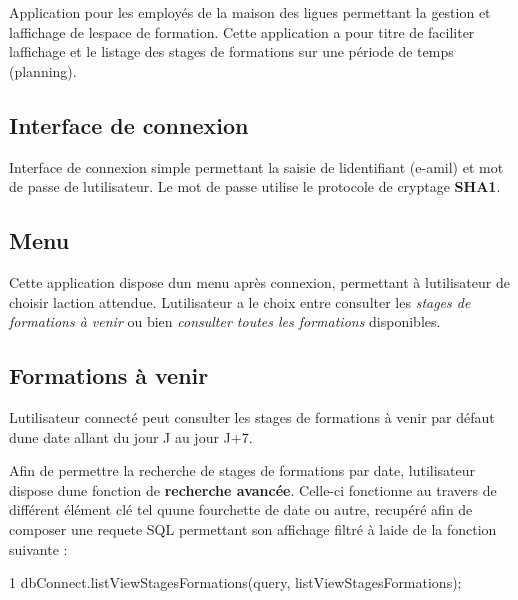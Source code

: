 Application pour les employés de la maison des ligues permettant la gestion et l\textquotesingle{}affichage de l\textquotesingle{}espace de formation. Cette application a pour titre de faciliter l\textquotesingle{}affichage et le listage des stages de formations sur une période de temps (planning).

\subsection*{Interface de connexion}

Interface de connexion simple permettant la saisie de l\textquotesingle{}identifiant (e-\/amil) et mot de passe de l\textquotesingle{}utilisateur. Le mot de passe utilise le protocole de cryptage {\bfseries S\+H\+A1}.



\subsection*{Menu}

Cette application dispose d\textquotesingle{}un menu après connexion, permettant à l\textquotesingle{}utilisateur de choisir l\textquotesingle{}action attendue. L\textquotesingle{}utilisateur a le choix entre consulter les {\itshape stages de formations à venir} ou bien {\itshape consulter toutes les formations} disponibles.

\subsection*{Formations à venir}

L\textquotesingle{}utilisateur connecté peut consulter les stages de formations à venir par défaut d\textquotesingle{}une date allant du jour J au jour J+7.



Afin de permettre la recherche de stages de formations par date, l\textquotesingle{}utilisateur dispose d\textquotesingle{}une fonction de {\bfseries recherche avancée}. Celle-\/ci fonctionne au travers de différent élément clé tel qu\textquotesingle{}une fourchette de date ou autre, recupéré afin de composer une requete S\+QL permettant son affichage filtré à l\textquotesingle{}aide de la fonction suivante \+:


\begin{DoxyCode}
1 dbConnect.listViewStagesFormations(query, listViewStagesFormations);
\end{DoxyCode}



